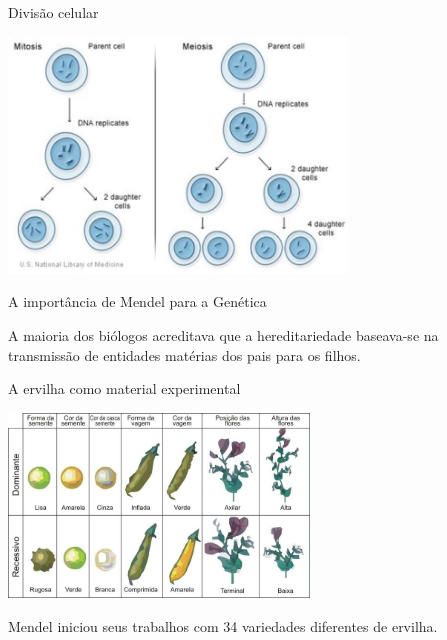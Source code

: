 \documentclass[]{beamer}
\begin{document}
  \begin{frame}{Divisão celular}
    \begin{center}
      \includegraphics[width=9cm]{images/divisao-celular.png}
    \end{center}
  \end{frame}

  \begin{frame}{A importância de Mendel para a Genética}
    \begin{center}
      A maioria dos biólogos acreditava que a hereditariedade baseava-se na transmissão de entidades matérias dos pais para os filhos.
    \end{center}
  \end{frame}

  \begin{frame}{A ervilha como material experimental}
    \begin{center}
      \includegraphics[width=8cm]{images/ervilha.png}

      \hspace{0.5cm}

      Mendel iniciou seus trabalhos com 34 variedades diferentes de ervilha.
    \end{center}
  \end{frame}
\end{document}
